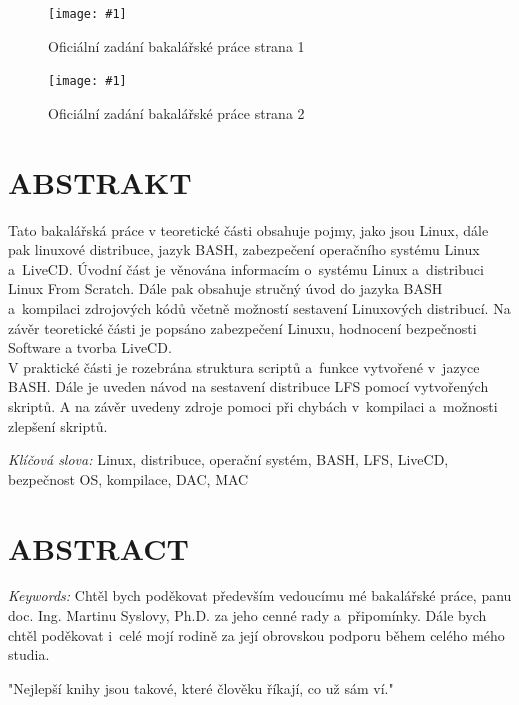 \documentclass[a4paper,12pt]{article}
\newcommand{\nm}[1]{\clearpage\section*{\uppercase{#1}}}	%
\newcommand{\nns}[1]{\section*{\uppercase{#1}}}		%
\newcommand{\obr}[3]{%
	\begin{figure}[h]
	\center\texttt{[image: \#1]}
	\caption{#3}
	\end{figure}
	}
\newcommand{\ofZadani}[2]{%
	\begin{figure}[h]
	\center\texttt{[image: \#1]}
	\caption{#2}
	\end{figure}
	}
\begin{document}
\clearpage
\thispagestyle{empty}
\ofZadani{./img/ofZadani/ofZadaniStr1.png}{Oficiální zadání bakalářské práce strana 1}
\clearpage
\thispagestyle{empty}
\ofZadani{./img/ofZadani/ofZadaniStr2.png}{Oficiální zadání bakalářské práce strana 2}
\clearpage
\thispagestyle{empty}
\voffset=-1.61cm\evensidemargin=0.96cm\oddsidemargin=0.96cm\headsep=1cm\headheight=0.5cm\setlength{\parskip}{3pt}\textheight=248mm\textwidth=155mm
\nm{\uppercase{Abstrakt}}
\vspace{1cm}
Tato bakalářská práce v teoretické části obsahuje pojmy, jako jsou Linux, dále pak linuxové distribuce, jazyk BASH, zabezpečení operačního systému Linux a~LiveCD. Úvodní část je věnována informacím o~systému Linux a~distribuci Linux From Scratch. Dále pak obsahuje stručný úvod do jazyka BASH a~kompilaci zdrojových kódů včetně možností sestavení Linuxových distribucí. Na závěr teoretické části je popsáno zabezpečení Linuxu, hodnocení bezpečnosti Software a tvorba LiveCD.\\

V praktické části je rozebrána struktura scriptů a~funkce vytvořené v~jazyce BASH. Dále je uveden návod na sestavení distribuce LFS pomocí vytvořených skriptů. A na závěr uvedeny zdroje pomoci při chybách v~kompilaci a~možnosti zlepšení skriptů.
\vspace{1cm}

\emph{Klíčová slova:} Linux, distribuce, operační systém, BASH, LFS, LiveCD, bezpečnost OS, kompilace, DAC, MAC

\vspace{3cm}

\nns{\uppercase{Abstract}}

\vspace{1cm}

\emph{Keywords:}
\clearpage
\thispagestyle{empty}
Chtěl bych poděkovat především vedoucímu mé bakalářské práce, panu doc. Ing. Martinu Syslovy, Ph.D. za jeho cenné rady a~připomínky.
Dále bych chtěl poděkovat i~celé mojí rodině za její obrovskou podporu během celého mého studia.

\vspace{3cm}
"Nejlepší knihy jsou takové, které člověku říkají, co už sám ví."\\
\end{document}
